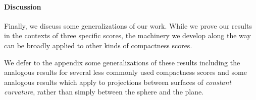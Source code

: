 \paragraph{Discussion}
Finally, we discuss some generalizations of our work. While we prove our results in the contexts of three specific scores, the machinery we develop along the way can be broadly applied to other kinds of compactness scores.  

We defer to the appendix some generalizations of these results including the analogous results for several less commonly used compactness scores and some analogous results which apply to projections between surfaces of \textit{constant curvature}, rather than simply between the sphere and the plane.


